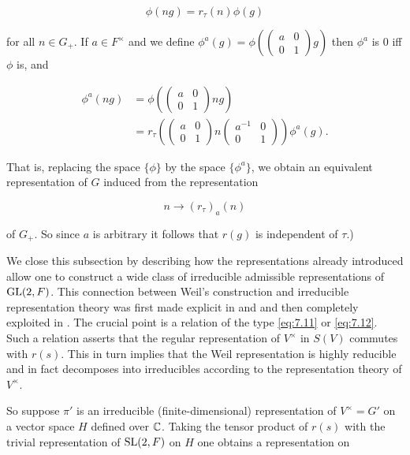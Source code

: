 \[
\phi(ng) = r_\tau(n)\phi(g)
\]

for all $n \in G_+$. If $a \in F^{\times}$ and we define $\phi^{a}(g) = \phi\left(\begin{pmatrix} a & 0 \\ 0 & 1 \end{pmatrix}g\right)$ then $\phi^{a}$ is 0 iff $\phi$ is, and

\[
\begin{aligned}
\phi^{a}(ng) &= \phi\left(\begin{pmatrix} a & 0 \\ 0 & 1 \end{pmatrix}ng\right)\\
&= r_\tau\left(\begin{pmatrix} a & 0 \\ 0 & 1 \end{pmatrix}n\begin{pmatrix} a^{-1} & 0 \\ 0 & 1 \end{pmatrix}\right)\phi^{a}(g).
\end{aligned}
\]

That is, replacing the space $\{\phi\}$ by the space $\{\phi^a\}$, we obtain an equivalent representation of $G$ induced from the representation

\[
n \to (r_\tau)_a(n)
\]

of $G_+$. So since $a$ is arbitrary it follows that $r(g)$ is independent of $\tau$.)

We close this subsection by describing how the representations already introduced allow one to construct a wide class of irreducible admissible representations of $\operatorname{GL}(2,F)$. This connection between Weil's construction and irreducible representation theory was first made explicit in \cite{Shalika} and \cite{Tanaka} and then completely exploited in \cite{JacquetLanglands}. The crucial point is a relation of the type \eqref{eq:7.11} or \eqref{eq:7.12}. Such a relation asserts that the regular representation of $V^{\times}$ in $S(V)$ commutes with $r(s)$. This in turn implies that the Weil representation is highly reducible and in fact decomposes into irreducibles according to the representation theory of $V^{\times}$.

So suppose $\pi'$ is an irreducible (finite-dimensional) representation of $V^{\times} = G'$ on a vector space $H$ defined over $\mathbb{C}$. Taking the tensor product of $r(s)$ with the trivial representation of $\operatorname{SL}(2,F)$ on $H$ one obtains a representation on

